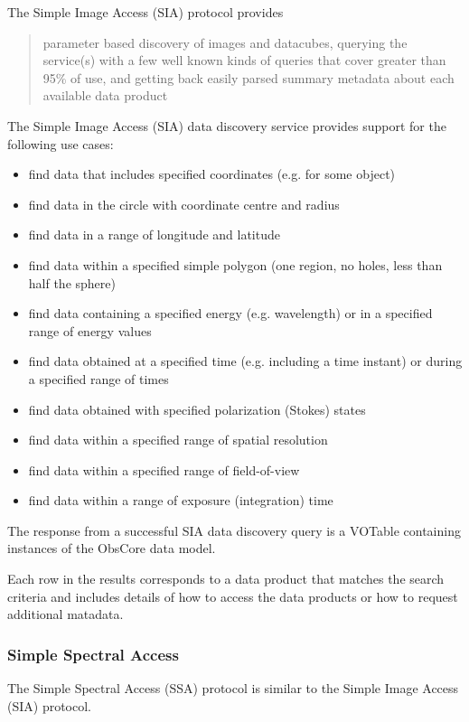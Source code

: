 \documentclass{article}
\begin{document}
The Simple Image Access (SIA) protocol provides 
\begin{quote}
parameter based discovery of images and datacubes, querying the service(s) with
a few well known kinds of queries that cover greater than 95\% of use, and
getting back easily parsed summary metadata about each available data product
\end{quote}

The Simple Image Access (SIA) data discovery service provides support for
the following use cases:

\begin{itemize}
  \item find data that includes specified coordinates (e.g. for some object) 
  \item find data in the circle with coordinate centre and radius 
  \item find data in a range of longitude and latitude 
  \item find data within a specified simple  polygon (one region, no holes, less
  than half the sphere)
  \item find data containing a specified energy (e.g. wavelength) or in a
  specified range of energy values
  \item find data obtained at a specified time (e.g. including a time instant)
  or during a specified range of times
  \item find data obtained with specified polarization (Stokes) states 
  \item find data within a specified range of spatial resolution 
  \item find data within a specified range of field-of-view 
  \item find data within a range of exposure (integration) time 
\end{itemize}

The response from a successful SIA data discovery query is a VOTable containing
instances of the ObsCore  data
model.

Each row in the results corresponds to a data product that matches the search
criteria and includes details of how to access the data products or how
to request additional matadata.

\subsubsection{Simple Spectral Access}

The Simple Spectral Access (SSA) protocol is similar to the Simple Image Access (SIA) protocol.
\end{document}
